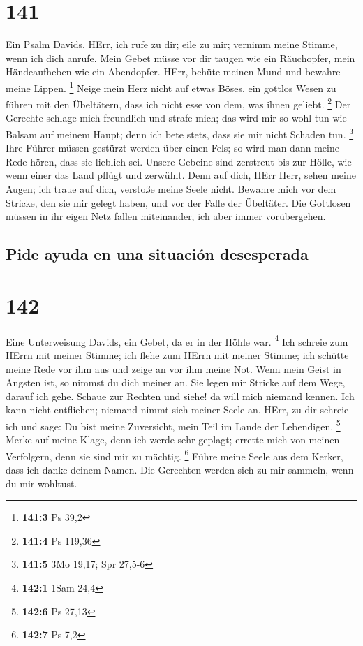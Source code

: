 \hypertarget{section-140}{%
\section{141}\label{section-140}}

 Ein Psalm Davids. HErr, ich rufe zu dir; eile zu mir;
vernimm meine Stimme, wenn ich dich anrufe.  Mein Gebet
müsse vor dir taugen wie ein Räuchopfer, mein Händeaufheben wie ein
Abendopfer.  HErr, behüte meinen Mund und bewahre meine
Lippen. \footnote{\textbf{141:3} Ps 39,2}  Neige mein Herz
nicht auf etwas Böses, ein gottlos Wesen zu führen mit den Übeltätern,
dass ich nicht esse von dem, was ihnen geliebt. \footnote{\textbf{141:4}
  Ps 119,36}  Der Gerechte schlage mich freundlich und
strafe mich; das wird mir so wohl tun wie Balsam auf meinem Haupt; denn
ich bete stets, dass sie mir nicht Schaden tun. \footnote{\textbf{141:5}
  3Mo 19,17; Spr 27,5-6}  Ihre Führer müssen gestürzt
werden über einen Fels; so wird man dann meine Rede hören, dass sie
lieblich sei.  Unsere Gebeine sind zerstreut bis zur
Hölle, wie wenn einer das Land pflügt und zerwühlt.  Denn
auf dich, HErr Herr, sehen meine Augen; ich traue auf dich, verstoße
meine Seele nicht.  Bewahre mich vor dem Stricke, den sie
mir gelegt haben, und vor der Falle der Übeltäter.  Die
Gottlosen müssen in ihr eigen Netz fallen miteinander, ich aber immer
vorübergehen.

\hypertarget{pide-ayuda-en-una-situaciuxf3n-desesperada}{%
\subsection{Pide ayuda en una situación
desesperada}\label{pide-ayuda-en-una-situaciuxf3n-desesperada}}

\hypertarget{section-141}{%
\section{142}\label{section-141}}

 Eine Unterweisung Davids, ein Gebet, da er in der Höhle
war. \footnote{\textbf{142:1} 1Sam 24,4}  Ich schreie zum
HErrn mit meiner Stimme; ich flehe zum HErrn mit meiner Stimme;
 ich schütte meine Rede vor ihm aus und zeige an vor ihm
meine Not.  Wenn mein Geist in Ängsten ist, so nimmst du
dich meiner an. Sie legen mir Stricke auf dem Wege, darauf ich gehe.
 Schaue zur Rechten und siehe! da will mich niemand
kennen. Ich kann nicht entfliehen; niemand nimmt sich meiner Seele an.
 HErr, zu dir schreie ich und sage: Du bist meine
Zuversicht, mein Teil im Lande der Lebendigen. \footnote{\textbf{142:6}
  Ps 27,13}  Merke auf meine Klage, denn ich werde sehr
geplagt; errette mich von meinen Verfolgern, denn sie sind mir zu
mächtig. \footnote{\textbf{142:7} Ps 7,2}  Führe meine
Seele aus dem Kerker, dass ich danke deinem Namen. Die Gerechten werden
sich zu mir sammeln, wenn du mir wohltust.

